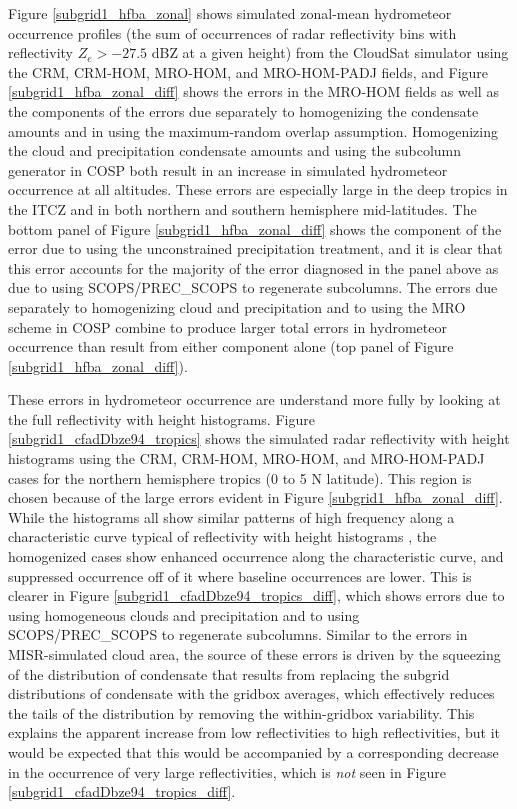Figure \ref{subgrid1_hfba_zonal} shows simulated zonal-mean hydrometeor occurrence profiles (the sum of occurrences of radar reflectivity bins with reflectivity  $Z_e > -27.5$ dBZ at a given height) from the CloudSat simulator using the CRM, CRM-HOM, MRO-HOM, and MRO-HOM-PADJ fields, and Figure \ref{subgrid1_hfba_zonal_diff} shows the errors in the MRO-HOM fields as well as the components of the errors due separately to homogenizing the condensate amounts and in using the maximum-random overlap assumption. Homogenizing the cloud and precipitation condensate amounts and using the subcolumn generator in COSP both result in an increase in simulated hydrometeor occurrence at all altitudes. These errors are especially large in the deep tropics in the ITCZ and in both northern and southern hemisphere mid-latitudes. The bottom panel of Figure \ref{subgrid1_hfba_zonal_diff} shows the component of the error due to using the unconstrained precipitation treatment, and it is clear that this error accounts for the majority of the error diagnosed in the panel above as due to using SCOPS/PREC\_SCOPS to regenerate subcolumns. The errors due separately to homogenizing cloud and precipitation and to using the MRO scheme in COSP combine to produce larger total errors in hydrometeor occurrence than result from either component alone (top panel of Figure \ref{subgrid1_hfba_zonal_diff}). 

These errors in hydrometeor occurrence are understand more fully by looking at the full reflectivity with height histograms. Figure \ref{subgrid1_cfadDbze94_tropics} shows the simulated radar reflectivity with height histograms using the CRM, CRM-HOM, MRO-HOM, and MRO-HOM-PADJ cases for the northern hemisphere tropics (0 to 5 N latitude). This region is chosen because of the large errors evident in Figure \ref{subgrid1_hfba_zonal_diff}. While the histograms all show similar patterns of high frequency along a characteristic curve typical of reflectivity with height histograms \citep[e.g.,][]{marchand_et_al_2009}, the homogenized cases show enhanced occurrence along the characteristic curve, and suppressed occurrence off of it where baseline occurrences are lower. This is clearer in Figure \ref{subgrid1_cfadDbze94_tropics_diff}, which shows errors due to using homogeneous clouds and precipitation and to using SCOPS/PREC\_SCOPS to regenerate subcolumns. Similar to the errors in MISR-simulated cloud area, the source of these errors is driven by the squeezing of the distribution of condensate that results from replacing the subgrid distributions of condensate with the gridbox averages, which effectively reduces the tails of the distribution by removing the within-gridbox variability. This explains the apparent increase from low reflectivities to high reflectivities, but it would be expected that this would be accompanied by a corresponding decrease in the occurrence of very large reflectivities, which is \emph{not} seen in Figure \ref{subgrid1_cfadDbze94_tropics_diff}. 
 
